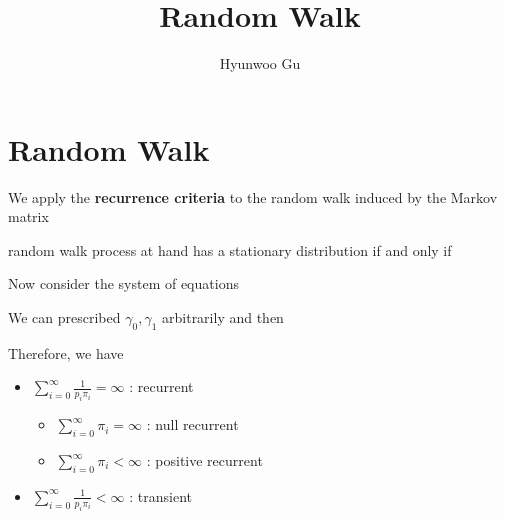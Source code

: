 \documentclass[12pt]{article}
\theoremstyle{nonumberbreak}
\begin{document}
\title{\textbf{Random Walk}}
\author{Hyunwoo Gu}
\date{}

\maketitle


\section{Random Walk}

We apply the \textbf{recurrence criteria}  to the random walk induced by the Markov matrix


random walk process at hand has a stationary distribution if and only if



Now consider the system of equations

We can prescribed $\gamma_0, \gamma_1$ arbitrarily and then 



Therefore, we have

\begin{itemize}
	\item $\sum_{i=0}^\infty \frac{1}{p_i \pi_i} = \infty$ : recurrent 
	\begin{itemize}
		\item $\sum_{i=0}^\infty \pi_i = \infty$ : null recurrent
		\item $\sum_{i=0}^\infty \pi_i < \infty$ : positive recurrent
	\end{itemize}
	\item $\sum_{i=0}^\infty \frac{1}{p_i \pi_i} < \infty$ : transient
\end{itemize}
\end{document}
